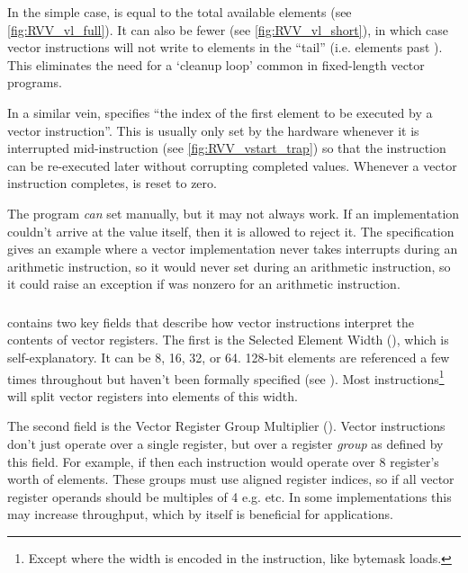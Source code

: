 In the simple case,  is equal to the total available elements (see \cref{fig:RVV_vl_full}).
It can also be fewer (see \cref{fig:RVV_vl_short}), in which case vector instructions will not write to elements in the \enquote{tail} (i.e. elements past ).
This eliminates the need for a `cleanup loop' common in fixed-length vector programs.


In a similar vein,  specifies \enquote{the index of the first element to be executed by a vector instruction}.
This is usually only set by the hardware whenever it is interrupted mid-instruction (see \cref{fig:RVV_vstart_trap}) so that the instruction can be re-executed later without corrupting completed values.
Whenever a vector instruction completes,  is reset to zero.

The program \emph{can} set  manually, but it may not always work.
If an implementation couldn't arrive at the value itself, then it is allowed to reject it.
The specification gives an example where a vector implementation never takes interrupts during an arithmetic instruction, so it would never set  during an arithmetic instruction, so it could raise an exception if  was nonzero for an arithmetic instruction.


\subsubsection{}
 contains two key fields that describe how vector instructions interpret the contents of vector registers.
The first is the Selected Element Width (), which is self-explanatory.
It can be 8, 16, 32, or 64.
128-bit elements are referenced a few times throughout but haven't been formally specified (see \cite[p32]{RISCVVectorExtension2021}).
Most instructions\footnote{Except where the width is encoded in the instruction, like bytemask loads.} will split vector registers into elements of this width.

The second field is the Vector Register Group Multiplier ().
Vector instructions don't just operate over a single register, but over a register \emph{group} as defined by this field.
For example, if  then each instruction would operate over 8 register's worth of elements.
These groups must use aligned register indices, so if  all vector register operands should be multiples of 4 e.g.  etc.
In some implementations this may increase throughput, which by itself is beneficial for applications.

